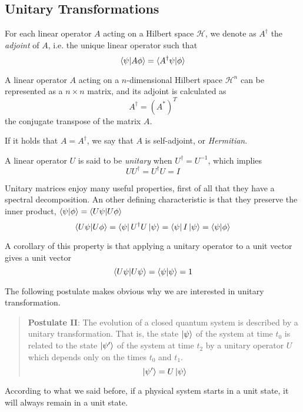 \documentclass[10pt,a4paper, titlepage]{report}
\theoremstyle{definition}
\newcommand{\kp}{\ket{\psi}}
\newcommand{\calH}{\mathcal{H}}
\begin{document}
\subsection{Unitary Transformations}

For each linear operator $A$ acting on a Hilbert space $\calH$, we denote as $A^\dagger$ the \textit{adjoint} of $A$, i.e. the unique linear operator such that
\[
	\braket{\psi|A\phi} = \braket{A^\dagger\psi|\phi}
\]

A linear operator $A$ acting on a $n$-dimensional Hilbert space $\calH^n$ can be represented as a $n\times n$ matrix, and its adjoint is calculated as 
\[
	A^\dagger = (A^*)^T
\] the conjugate transpose of the matrix $A$.


If it holds that $A = A^\dagger$, we say that $A$ is self-adjoint, or \textit{Hermitian}.

A linear operator $U$ is said to be \textit{unitary} when $U^\dagger = U^{-1}$, which implies 
\[
	UU^\dagger = U^\dagger U = I
\]

Unitary matrices enjoy many useful properties, first of all that they have a spectral decomposition. An other defining characteristic is that they preserve the inner product, $\braket{\psi | \phi} = \braket{U\psi | U\phi}$
\[
	\braket{U\psi | U\phi} = \bra{\psi}U^\dagger U\ket{\psi} = \bra{\psi}I\ket{\psi} = \braket{\psi|\phi}
\]

A corollary of this property is that applying a unitary operator to a unit vector gives a unit vector
\[
	\braket{U\psi | U\psi} = \braket{\psi|\psi} = 1
\]

The following postulate makes obvious why we are interested in unitary transformation.
\begin{quote}
\textbf{Postulate II}: The evolution of a closed quantum system is described by a unitary transformation. That is, the state $\kp$ of the system at time $t_0$ is related to the state $\ket{\psi^\prime}$ of the system at time $t_2$ by a unitary operator $U$ which depends only on the times $t_0$ and $t_1$.
\[
	\ket{\psi^\prime} = U\kp
\]
\end{quote}

According to what we said before, if a physical system starts in a unit state, it will always remain in a unit state.
\end{document}

